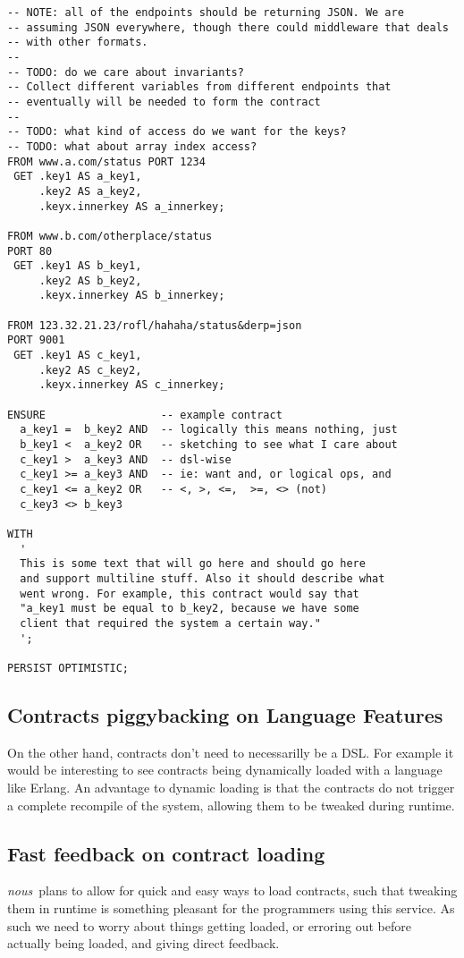\documentclass[12pt,twoside]{article}
\newcommand{\projectname}[0]{\textit{nous}}
\begin{document}
\begin{lstlisting}[language=nouscontract,caption='Sample Contract']
-- NOTE: all of the endpoints should be returning JSON. We are
-- assuming JSON everywhere, though there could middleware that deals
-- with other formats.
--
-- TODO: do we care about invariants?
-- Collect different variables from different endpoints that
-- eventually will be needed to form the contract
--
-- TODO: what kind of access do we want for the keys?
-- TODO: what about array index access?
FROM www.a.com/status PORT 1234
 GET .key1 AS a_key1,
     .key2 AS a_key2,
     .keyx.innerkey AS a_innerkey;

FROM www.b.com/otherplace/status
PORT 80
 GET .key1 AS b_key1,
     .key2 AS b_key2,
     .keyx.innerkey AS b_innerkey;

FROM 123.32.21.23/rofl/hahaha/status&derp=json
PORT 9001
 GET .key1 AS c_key1,
     .key2 AS c_key2,
     .keyx.innerkey AS c_innerkey;

ENSURE                  -- example contract
  a_key1 =  b_key2 AND  -- logically this means nothing, just
  b_key1 <  a_key2 OR   -- sketching to see what I care about
  c_key1 >  a_key3 AND  -- dsl-wise
  c_key1 >= a_key3 AND  -- ie: want and, or logical ops, and
  c_key1 <= a_key2 OR   -- <, >, <=,  >=, <> (not)
  c_key3 <> b_key3

WITH
  '
  This is some text that will go here and should go here
  and support multiline stuff. Also it should describe what
  went wrong. For example, this contract would say that
  "a_key1 must be equal to b_key2, because we have some
  client that required the system a certain way."
  ';

PERSIST OPTIMISTIC;
\end{lstlisting}

\subsection{Contracts piggybacking on Language Features}
On the other hand, contracts don't need to necessarilly be a DSL. For
example it would be interesting to see contracts being dynamically
loaded with a language like Erlang. An advantage to dynamic loading is
that the contracts do not trigger a complete recompile of the system,
allowing them to be tweaked during runtime.

\subsection{Fast feedback on contract loading}
\projectname \ plans to allow for quick and easy ways to load contracts,
such that tweaking them in runtime is something pleasant for the
programmers using this service. As such we need to worry about things
getting loaded, or erroring out before actually being loaded, and
giving direct feedback.
\end{document}
